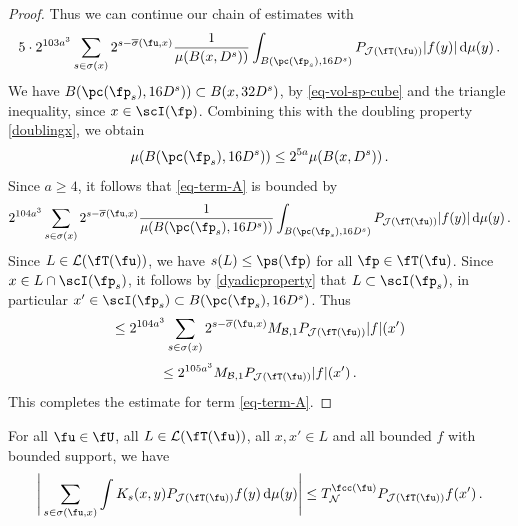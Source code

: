 \begin{proof}
    Thus we can continue our chain of estimates with
    $$
        5\cdot 2^{103a^3} \sum_{s\in\sigma(x)}2^{s - \overline{\sigma}(\fu, x)} \frac{1}{\mu(B(x,D^s))}\int_{B(\pc(\fp_s),16 D^s)}P_{\mathcal{J}(\fT(\fu))}|f(y)|\,\mathrm{d}\mu(y)\,.
    $$
    We have $B(\pc(\fp_s), 16D^s)) \subset B(x, 32D^s)$, by \eqref{eq-vol-sp-cube} and the triangle inequality, since $x \in \scI(\fp)$. Combining this with the doubling property \eqref{doublingx}, we obtain
    $$
        \mu(B(\pc(\fp_s), 16D^s)) \le 2^{5a} \mu(B(x, D^s))\,.
    $$
    Since $a \ge 4$, it follows that \eqref{eq-term-A} is bounded by
    $$
        2^{104a^3} \sum_{s\in\sigma(x)}2^{s - \overline{\sigma}(\fu, x)} \frac{1}{\mu(B(\pc(\fp_s),16D^s))}\int_{B(\pc(\fp_s),16D^s)}P_{\mathcal{J}(\fT(\fu))}|f(y)|\,\mathrm{d}\mu(y)\,.
    $$
    Since $L \in \mathcal{L}(\fT(\fu))$, we have $s(L) \le \ps(\fp)$ for all $\fp \in \fT(\fu)$. Since $x\in L \cap \scI(\fp_s)$, it follows by \eqref{dyadicproperty} that $L \subset \scI(\fp_s)$, in particular $x' \in \scI(\fp_s) \subset B(\pc(\fp_s), 16D^s)$. Thus
    $$
        \le 2^{104a^3} \sum_{s\in\sigma(x)}2^{s - \overline{\sigma}(\fu, x)} M_{\mathcal{B}, 1}P_{\mathcal{J}(\fT(\fu))}|f|(x')
    $$
    $$
        \le 2^{105a^3} M_{\mathcal{B}, 1}P_{\mathcal{J}(\fT(\fu))}|f|(x')\,.
    $$
    This completes the estimate for term \eqref{eq-term-A}.
\end{proof}

\begin{lemma}
    \label{second-tree-pointwise}
    \leanok
    For all $\fu \in \fU$, all $L \in \mathcal{L}(\fT(\fu))$, all $x, x' \in L$ and all bounded $f$ with bounded support, we have
    $$
         \Bigg| \sum_{s \in \sigma(\fu, x)} \int K_s(x,y) P_{\mathcal{J}(\fT(\fu))} f(y) \, \mathrm{d}\mu(y) \Bigg| \le T_{\mathcal{N}}^{\fcc(\fu)} P_{\mathcal{J}(\fT(\fu))} f(x')\,.
    $$
\end{lemma}

